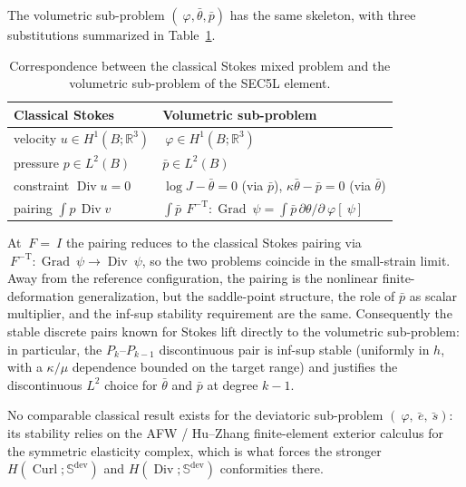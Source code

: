 \documentclass[12pt]{article}
\newcommand{\F}{~F}
\newcommand{\ebar}{\bar{~e}}
\newcommand{\sbar}{\bar{~s}}
\newcommand{\thbar}{\bar{\theta}}
\newcommand{\pbar}{\bar{p}}
\newcommand{\supdev}{^{\mathrm{dev}}}
\newcommand{\Symsd}{\mathbb{S}\supdev}
\DeclareMathOperator{\Div}{Div}
\DeclareMathOperator{\Grad}{Grad}
\DeclareMathOperator{\Curl}{Curl}
\begin{document}
The volumetric sub-problem $(~\varphi, \thbar, \pbar)$ has
the same skeleton, with three substitutions summarized in
Table~\ref{tab:stokes-correspondence}.
\begin{table}[h]
  \centering
  \begin{tabular}{@{}ll@{}}
    \toprule
    Classical Stokes & Volumetric sub-problem \\
    \midrule
    velocity $u \in H^1(B; \mathbb{R}^3)$ & $~\varphi \in H^1(B; \mathbb{R}^3)$ \\
    pressure $p \in L^2(B)$ & $\pbar \in L^2(B)$ \\
    constraint $\Div u = 0$ &
      $\log J - \thbar = 0$ (via $\pbar$), $\kappa \thbar - \pbar = 0$ (via $\thbar$) \\
    pairing $\int p\,\Div v$ &
      $\int \pbar \, \F^{-\mathrm{T}}\!:\!\Grad ~\psi = \int \pbar\, \partial \theta / \partial ~\varphi [~\psi]$ \\
    \bottomrule
  \end{tabular}
  \caption{Correspondence between the classical Stokes mixed
    problem and the volumetric sub-problem of the SEC5L element.}
  \label{tab:stokes-correspondence}
\end{table}

At $\F = ~I$ the pairing reduces to the classical Stokes pairing
via $\F^{-\mathrm{T}}\!:\!\Grad ~\psi \to \Div ~\psi$, so the two
problems coincide in the small-strain limit. Away from the
reference configuration, the pairing is the nonlinear
finite-deformation generalization, but the saddle-point structure,
the role of $\pbar$ as scalar multiplier, and the inf-sup stability
requirement are the same. Consequently the stable discrete pairs
known for Stokes lift directly to the volumetric sub-problem: in
particular, the $P_k$--$P_{k-1}$ discontinuous pair is inf-sup
stable (uniformly in $h$, with a $\kappa/\mu$ dependence bounded on
the target range) and justifies the discontinuous $L^2$ choice for
$\thbar$ and $\pbar$ at degree $k-1$.

No comparable classical result exists for the deviatoric sub-problem
$(~\varphi, \ebar, \sbar)$: its stability relies on the AFW / Hu--Zhang
finite-element exterior calculus for the symmetric elasticity complex,
which is what forces the stronger $H(\Curl; \Symsd)$ and
$H(\Div; \Symsd)$ conformities there.
\end{document}

